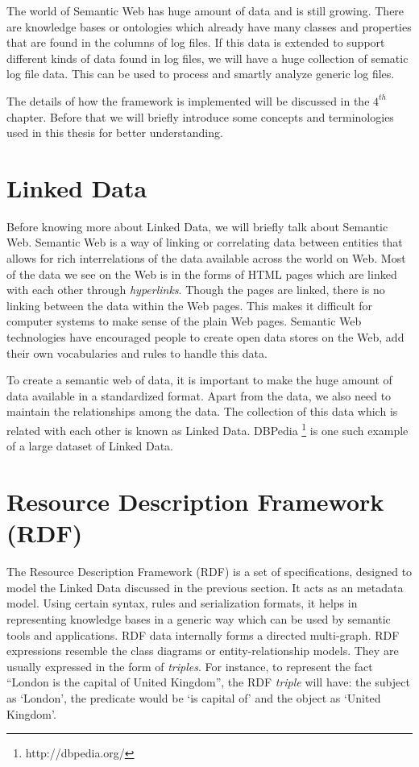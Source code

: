 The world of Semantic Web has huge amount of data and is still growing. There are knowledge bases or ontologies which already have many classes and properties that are found in the columns of log files. If this data is extended to support different kinds of data found in log files, we will have a huge collection of sematic log file data. This can be used to process and smartly analyze generic log files.

The details of how the framework is implemented will be discussed in the $4^{th}$ chapter. Before that we will briefly introduce some concepts and terminologies used in this thesis for better understanding.

\section{Linked Data}

Before knowing more about Linked Data, we will briefly talk about Semantic Web. Semantic Web is a way of linking or correlating data between entities that allows for rich interrelations of the data available across the world on Web. Most of the data we see on the Web is in the forms of HTML pages which are linked with each other through \textit{hyperlinks}. Though the pages are linked, there is no linking between the data within the Web pages. This makes it difficult for computer systems to make sense of the plain Web pages. Semantic Web technologies have encouraged people to create open data stores on the Web, add their own vocabularies and rules to handle this data.

To create a semantic web of data, it is important to make the huge amount of data available in a standardized format. Apart from the data, we also need to maintain the relationships among the data. The collection of this data which is related with each other is known as Linked Data. DBPedia \footnote{http://dbpedia.org/} is one such example of a large dataset of Linked Data.

\section{Resource Description Framework (RDF)}

The Resource Description Framework (RDF) is a set of specifications, designed to model the Linked Data discussed in the previous section. It acts as an metadata model. Using certain syntax, rules and serialization formats, it helps in representing knowledge bases in a generic way which can be used by semantic tools and applications. RDF data internally forms a directed multi-graph. RDF expressions resemble the class diagrams or entity-relationship models. They are usually expressed in the form of \textit{triples}. For instance, to represent the fact ``London is the capital of United Kingdom'', the RDF \textit{triple} will have: the subject as `London', the predicate would be `is capital of' and the object as `United Kingdom'.

